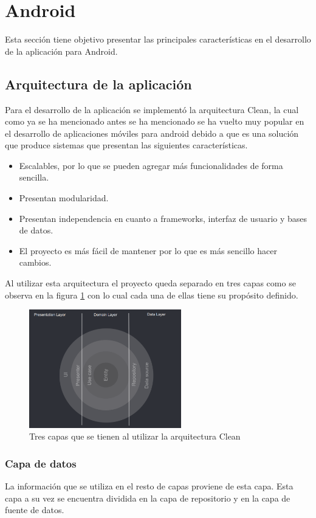 \section{Android}
Esta sección tiene objetivo presentar las principales características en el desarrollo de la aplicación para Android.
\subsection{Arquitectura de la aplicación}
Para el desarrollo de la aplicación se implementó la arquitectura Clean, la cual como ya se ha mencionado antes se ha mencionado se ha vuelto muy popular en el desarrollo de aplicaciones móviles para android debido a que es una solución que produce sistemas que presentan las siguientes características.

\begin{itemize}
    \item Escalables, por lo que se pueden agregar más funcionalidades de forma sencilla.
    \item Presentan modularidad.
    \item Presentan independencia en cuanto a frameworks, interfaz de usuario y bases de datos.
    \item El proyecto es más fácil de mantener por lo que es más sencillo hacer cambios.
\end{itemize}

Al utilizar esta arquitectura el proyecto queda separado en tres capas como se observa en la figura \ref{fig:capas-arquitectura} con lo cual cada una de ellas tiene su propósito definido.

\begin{figure}[h]
    \centering
    \includegraphics[width=250px]{capitulo5/android/img/capas-clean.png}
    \caption{Tres capas que se tienen al utilizar la arquitectura Clean \cite{cleanGuide}}
    \label{fig:capas-arquitectura}
\end{figure}

\subsubsection{Capa de datos}
La información que se utiliza en el resto de capas proviene de esta capa. Esta capa a su vez se encuentra dividida en la capa de repositorio y en la capa de fuente de datos. 

